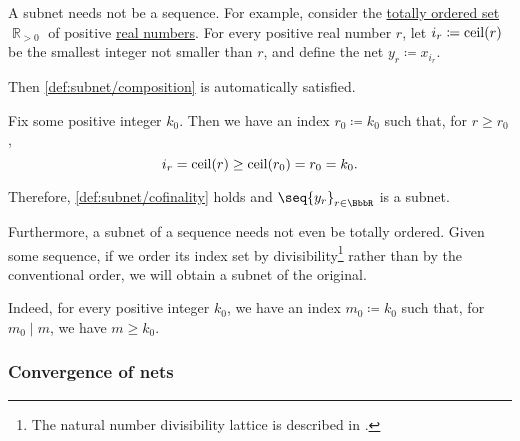 \begin{example}
\begin{thmenum}
    A subnet needs not be a sequence. For example, consider the \hyperref[def:totally_ordered_set]{totally ordered set} \( \BbbR_{>0} \) of positive \hyperref[def:real_numbers]{real numbers}. For every positive real number \( r \), let \( i_r \coloneqq \operatorname{ceil}(r) \) be the smallest integer not smaller than \( r \), and define the net \( y_r \coloneqq x_{i_r} \).

    Then \ref{def:subnet/composition} is automatically satisfied.

    Fix some positive integer \( k_0 \). Then we have an index \( r_0 \coloneqq k_0 \) such that, for \( r \geq r_0 \),
    \begin{equation*}
      i_r = \operatorname{ceil}(r) \geq \operatorname{ceil}(r_0) = r_0 = k_0.
    \end{equation*}

    Therefore, \ref{def:subnet/cofinality} holds and \( \seq{ y_r }_{r \in \BbbR} \) is a subnet.

     Furthermore, a subnet of a sequence needs not even be totally ordered. Given some sequence, if we order its index set by divisibility\footnote{The natural number divisibility lattice is described in .} rather than by the conventional order, we will obtain a subnet of the original.

    Indeed, for every positive integer \( k_0 \), we have an index \( m_0 \coloneqq k_0 \) such that, for \( m_0 \mid m \), we have \( m \geq k_0 \).
  \end{thmenum}
\end{example}

\subsubsection{Convergence of nets}

